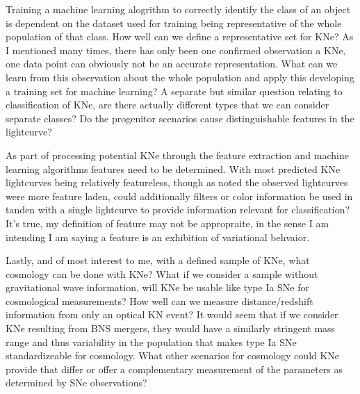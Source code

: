 \documentclass[12pt]{article}
\begin{document}
Training a machine learning alogrithm to correctly identify the class of an object is dependent on the dataset used for training being representative of the whole population of that class. How well can we define a representative set for KNe? As I mentioned many times, there has only been one confirmed observation a KNe, one data point can obviously not be an accurate representation. What can we learn from this observation about the whole population and apply this developing a training set for machine learning? A separate but similar question relating to classification of KNe, are there actually different types that we can consider separate classes? Do the progenitor scenarios cause distinguishable features in the lightcurve? \par
As part of processing potential KNe through the feature extraction and machine learning algorithms features need to be determined. With most predicted KNe lightcurves being relatively featureless, though as noted the observed lightcurves were more feature laden, could additionally filters or color information be used in tanden with a single lightcurve to provide information relevant for classification? It's true, my definition of feature may not be appropraite, in the sense I am intending I am saying a feature is an exhibition of variational behvaior. \par
Lastly, and of most interest to me, with a defined sample of KNe, what cosmology can be done with KNe? What if we consider a sample without gravitational wave information, will KNe be usable like type Ia SNe for cosmological measurements? How well can we measure distance/redshift information from only an optical KN event? It would seem that if we consider KNe resulting from BNS mergers, they would have a similarly stringent mass range and thus variability in the population that makes type Ia SNe standardizeable for cosmology. What other scenarios for cosmology could KNe provide that differ or offer a complementary measurement of the parameters as determined by SNe observations? \par



\end{document}
